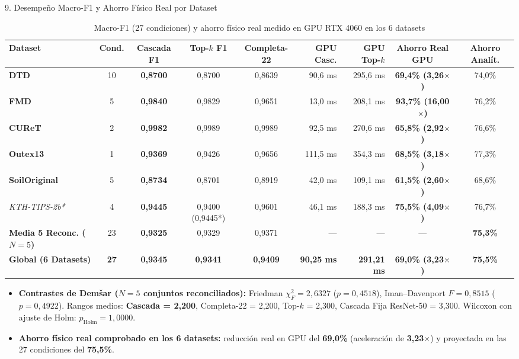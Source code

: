 \documentclass[aspectratio=169,10pt]{beamer}
\begin{document}
\begin{frame}{9. Desempeño Macro-F1 y Ahorro Físico Real por Dataset}
\begin{table}
\centering
\scriptsize
\caption{Macro-F1 (27 condiciones) y ahorro físico real medido en GPU RTX 4060 en los 6 datasets}
\begin{tabular}{@{}lccccrrcc@{}}
\toprule
Dataset & Cond. & Cascada F1 & Top-$k$ F1 & Completa-22 & GPU Casc. & GPU Top-$k$ & \textbf{Ahorro Real GPU} & Ahorro Analít. \\
\midrule
\textbf{DTD} & 10 & \textbf{0,8700} & 0,8700 & 0,8639 & 90,6 ms & 295,6 ms & \textbf{69,4\% (3,26$\times$)} & 74,0\% \\
\textbf{FMD} & 5  & \textbf{0,9840} & 0,9829 & 0,9651 & 13,0 ms & 208,1 ms & \textbf{93,7\% (16,00$\times$)} & 76,2\% \\
\textbf{CUReT} & 2 & \textbf{0,9982} & 0,9989 & 0,9989 & 92,5 ms & 270,6 ms & \textbf{65,8\% (2,92$\times$)} & 76,6\% \\
\textbf{Outex13} & 1 & \textbf{0,9369} & 0,9426 & 0,9656 & 111,5 ms & 354,3 ms & \textbf{68,5\% (3,18$\times$)} & 77,3\% \\
\textbf{SoilOriginal} & 5 & \textbf{0,8734} & 0,8701 & 0,8919 & 42,0 ms & 109,1 ms & \textbf{61,5\% (2,60$\times$)} & 68,6\% \\
\midrule
\emph{KTH-TIPS-2b*} & 4 & \textbf{0,9445} & 0,9400 (0,9445*) & 0,9601 & 46,1 ms & 188,3 ms & \textbf{75,5\% (4,09$\times$)} & 76,7\% \\
\midrule
\textbf{Media 5 Reconc. ($N=5$)} & 23 & \textbf{0,9325} & 0,9329 & 0,9371 & — & — & — & \textbf{75,3\%} \\
\textbf{Global (6 Datasets)} & \textbf{27} & \textbf{0,9345} & \textbf{0,9341} & \textbf{0,9409} & \textbf{90,25 ms} & \textbf{291,21 ms} & \textbf{69,0\% (3,23$\times$)} & \textbf{75,5\%} \\
\bottomrule
\end{tabular}
\end{table}
\vspace{-0.4em}
\begin{itemize}\scriptsize
\item \textbf{Contrastes de Demšar ($N=5$ conjuntos reconciliados):} Friedman $\chi^2_F = 2{,}6327$ ($p = 0{,}4518$), Iman--Davenport $F = 0{,}8515$ ($p = 0{,}4922$). Rangos medios: \textbf{Cascada = 2,200}, Completa-22 = 2,200, Top-$k$ = 2,300, Cascada Fija ResNet-50 = 3,300. Wilcoxon con ajuste de Holm: $p_{\text{Holm}} = 1{,}0000$.
\item \textbf{Ahorro físico real comprobado en los 6 datasets:} reducción real en GPU del \textbf{69,0\%} (aceleración de \textbf{3,23$\times$}) y proyectada en las 27 condiciones del \textbf{75,5\%}.
\end{itemize}
\end{frame}
\end{document}
